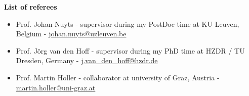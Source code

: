\makeletterclosing %

\textbf{List of referees}
\bigskip
\begin{itemize}
\item Prof. Johan Nuyts - supervisor during my PostDoc time at KU Leuven, Belgium - \href{mailto:johan.nuyts@uzleuven.be}{johan.nuyts@uzleuven.be}
\item Prof. J\"org van den Hoff - supervisor during my PhD time at HZDR / TU Dresden, Germany - \href{mailto:j.van_den_hoff@hzdr.de}{j.van\_den\_hoff@hzdr.de}
\item Prof. Martin Holler - collaborator at university of Graz, Austria - \href{mailto:martin.holler@uni-graz.at}{martin.holler@uni-graz.at}
\end{itemize}

\clearpage
